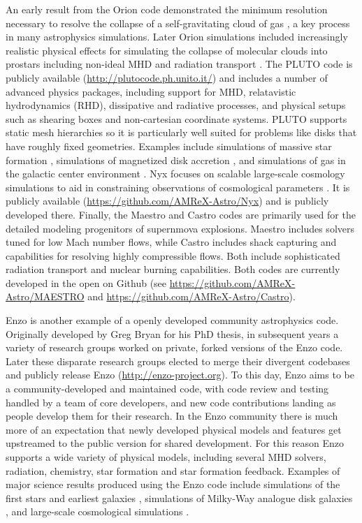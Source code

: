 \documentclass[11pt,twoside]{article}
\begin{document}
An early result from the Orion code \citep{howell2003} demonstrated the minimum resolution necessary to resolve the collapse of a self-gravitating cloud of gas  \citep{truelove1998}, a key process in many astrophysics simulations. Later Orion simulations included increasingly realistic physical effects for simulating the collapse of molecular clouds into prostars including non-ideal MHD and radiation transport \citep{myers2014, rosen2016}. The PLUTO code \citep{mignone2012} is publicly available (\url{http://plutocode.ph.unito.it/}) and includes a number of advanced physics packages, including support for MHD, relatavistic hydrodynamics (RHD), dissipative and radiative processes, and physical setups such as shearing boxes and non-cartesian coordinate systems. PLUTO supports static mesh hierarchies so it is particularly well suited for problems like disks that have roughly fixed geometries. Examples include simulations of massive star formation \citep{kuiper2010}, simulations of magnetized disk accretion \citep{lesur2014}, and simulations of gas in the galactic center environment \citep{burkert2012}. Nyx \citep{almgren2013} focuses on scalable large-scale cosmology simulations to aid in constraining observations of cosmological parameters \citep{sorini2016}. It is publicly available (\url{https://github.com/AMReX-Astro/Nyx}) and is publicly developed there. Finally, the Maestro and Castro codes are primarily used for the detailed modeling progenitors of supernmova explosions. Maestro \citep{nonoka2014} includes solvers tuned for low Mach number flows, while Castro \citep{almgren2010} includes shack capturing and capabilities for resolving highly compressible flows. Both include sophisticated radiation transport and nuclear burning capabilities. Both codes are currently developed in the open on Github (see \url{https://github.com/AMReX-Astro/MAESTRO} and \url{https://github.com/AMReX-Astro/Castro}).

Enzo \citep{bryan2014} is another example of a openly developed community astrophysics code. Originally developed by Greg Bryan for his PhD thesis, in subsequent years a variety of research groups worked on private, forked versions of the Enzo code. Later these disparate research groups elected to merge their divergent codebases and publicly release Enzo (\url{http://enzo-project.org}). To this day, Enzo aims to be a community-developed and maintained code, with code review and testing handled by a team of core developers, and new code contributions landing as people develop them for their research. In the Enzo community there is much more of an expectation that newly developed physical models and features get upstreamed to the public version for shared development. For this reason Enzo supports a wide variety of physical models, including several MHD solvers, radiation, chemistry, star formation and star formation feedback. Examples of major science results produced using the Enzo code include simulations of the first stars \citep{abel2002} and earliest galaxies \citep{wise2012}, simulations of Milky-Way analogue disk galaxies \citep{goldbaum2016}, and large-scale cosmological simulations \cite{xu2016}.
\end{document}
